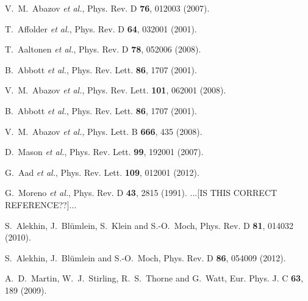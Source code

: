 \documentclass[aps,prd,amsmath,preprint]{revtex4}
\begin{document}
\begin{thebibliography}{99}
V.~M.~Abazov {\it et al.},
Phys. Rev. D {\bf 76}, 012003 (2007).

T.~Affolder {\it et al.},
Phys. Rev. D {\bf 64}, 032001 (2001).

T.~Aaltonen {\it et al.},
Phys. Rev. D {\bf 78}, 052006 (2008).

B.~Abbott {\it et al.},
Phys. Rev. Lett. {\bf 86}, 1707 (2001).

V.~M.~Abazov {\it et al.},
Phys. Rev. Lett. {\bf 101}, 062001 (2008). 

B.~Abbott {\it et al.},
Phys. Rev. Lett. {\bf 86}, 1707 (2001).

V.~M.~Abazov {\it et al.},
Phys. Lett. B {\bf 666}, 435 (2008).

D.~Mason {\it et al.},
Phys. Rev. Lett. {\bf 99}, 192001 (2007).

G.~Aad {\it et al.},
Phys. Rev. Lett. {\bf 109}, 012001 (2012).

%
%
%
%
%

G.~Moreno {\it et al.},  
Phys. Rev. D {\bf 43}, 2815 (1991).
{\color{red}...[IS THIS CORRECT REFERENCE??]...}

S.~Alekhin, J.~Bl\"umlein, S.~Klein and S.-O.~Moch,
Phys. Rev. D {\bf 81}, 014032 (2010).

S.~Alekhin, J.~Bl\"umlein and S.-O.~Moch,
Phys. Rev. D {\bf 86}, 054009 (2012).

A.~D.~Martin, W.~J.~Stirling, R.~S.~Thorne and G.~Watt,
Eur. Phys. J. C {\bf 63}, 189 (2009).



\end{thebibliography}
\end{document}
